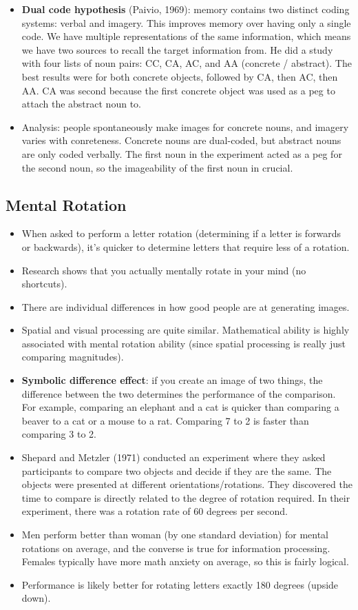 \documentclass[]{article}
\begin{document}
\begin{itemize}
				\item \textbf{Dual code hypothesis} (Paivio, 1969): memory contains two distinct coding systems: verbal and imagery. This improves memory over having only a single code. We have multiple representations of the same information, which means we have two sources to recall the target information from. He did a study with four lists of noun pairs: CC, CA, AC, and AA (concrete / abstract). The best results were for both concrete objects, followed by CA, then AC, then AA. CA was second because the first concrete object was used as a peg to attach the abstract noun to.
				\item Analysis: people spontaneously make images for concrete nouns, and imagery varies with conreteness. Concrete nouns are dual-coded, but abstract nouns are only coded verbally. The first noun in the experiment acted as a peg for the second noun, so the imageability of the first noun in crucial.
			\end{itemize}

		\subsection{Mental Rotation}
			\begin{itemize}
				\item When asked to perform a letter rotation (determining if a letter is forwards or backwards), it's quicker to determine letters that require less of a rotation.
				\item Research shows that you actually mentally rotate in your mind (no shortcuts).
				\item There are individual differences in how good people are at generating images.
				\item Spatial and visual processing are quite similar. Mathematical ability is highly associated with mental rotation ability (since spatial processing is really just comparing magnitudes).
				\item \textbf{Symbolic difference effect}: if you create an image of two things, the difference between the two determines the performance of the comparison. For example, comparing an elephant and a cat is quicker than comparing a beaver to a cat or a mouse to a rat. Comparing 7 to 2 is faster than comparing 3 to 2.
				\item Shepard and Metzler (1971) conducted an experiment where they asked participants to compare two objects and decide if they are the same. The objects were presented at different orientations/rotations. They discovered the time to compare is directly related to the degree of rotation required. In their experiment, there was a rotation rate of 60 degrees per second.
				\item Men perform better than woman (by one standard deviation) for mental rotations on average, and the converse is true for information processing. Females typically have more math anxiety on average, so this is fairly logical.
				\item Performance is likely better for rotating letters exactly 180 degrees (upside down).
			\end{itemize}
\end{document}
